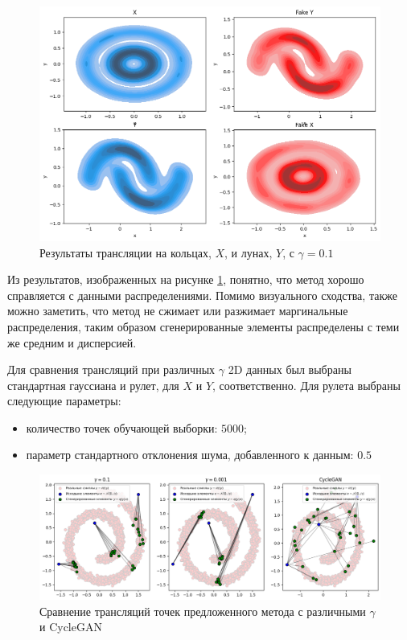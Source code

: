 \begin{figure}
    \centering
    \includegraphics[width=1\linewidth]{images/2d_results.png}
    \caption{Результаты трансляции на кольцах, $X$, и  лунах, $Y$, с $\gamma = 0.1$}
    \label{fig:2d-res}
\end{figure}

Из результатов, изображенных на рисунке \ref{fig:2d-res}, понятно, что метод хорошо справляется с данными распределениями. Помимо визуального сходства, также можно заметить, что метод не сжимает или разжимает маргинальные распределения, таким образом сгенерированные элементы распределены с теми же средним и дисперсией.

Для сравнения трансляций при различных $\gamma$ 2D данных был выбраны стандартная гауссиана и рулет, для $X$ и $Y$, соответственно. Для рулета выбраны следующие параметры:
\begin{itemize}
    \item количество точек обучающей выборки: $5000$;
    \item параметр стандартного отклонения шума, добавленного к данным: $0.5$
\end{itemize}

\begin{figure}
    \centering
    \includegraphics[width=1\linewidth]{images/2d_gamma.png}
    \caption{Сравнение трансляций точек предложенного метода с различными $\gamma$ и CycleGAN}
    \label{fig:2d-gamma}
\end{figure}

